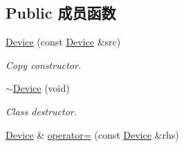 \subsection*{Public 成员函数}
\begin{DoxyCompactItemize}
\item 
\hyperlink{classmv_i_m_p_a_c_t_1_1acquire_1_1_device_a20235ebedf424e31d1fed2433ba3408f}{Device} (const \hyperlink{classmv_i_m_p_a_c_t_1_1acquire_1_1_device}{Device} \&src)
\begin{DoxyCompactList}\small\item\em Copy constructor. \end{DoxyCompactList}\item 
\hyperlink{classmv_i_m_p_a_c_t_1_1acquire_1_1_device_a4eeacbcb3dcfd03d39faa3eba43ead6f}{$\sim$\+Device} (void)
\begin{DoxyCompactList}\small\item\em Class destructor. \end{DoxyCompactList}\item 
\hypertarget{classmv_i_m_p_a_c_t_1_1acquire_1_1_device_a3f4faaf1d0c1d88c0daecace9b9e3abc}{\hyperlink{classmv_i_m_p_a_c_t_1_1acquire_1_1_device}{Device} \& \hyperlink{classmv_i_m_p_a_c_t_1_1acquire_1_1_device_a3f4faaf1d0c1d88c0daecace9b9e3abc}{operator=} (const \hyperlink{classmv_i_m_p_a_c_t_1_1acquire_1_1_device}{Device} \&rhs)}\label{classmv_i_m_p_a_c_t_1_1acquire_1_1_device_a3f4faaf1d0c1d88c0daecace9b9e3abc}


\end{DoxyCompactItemize}
